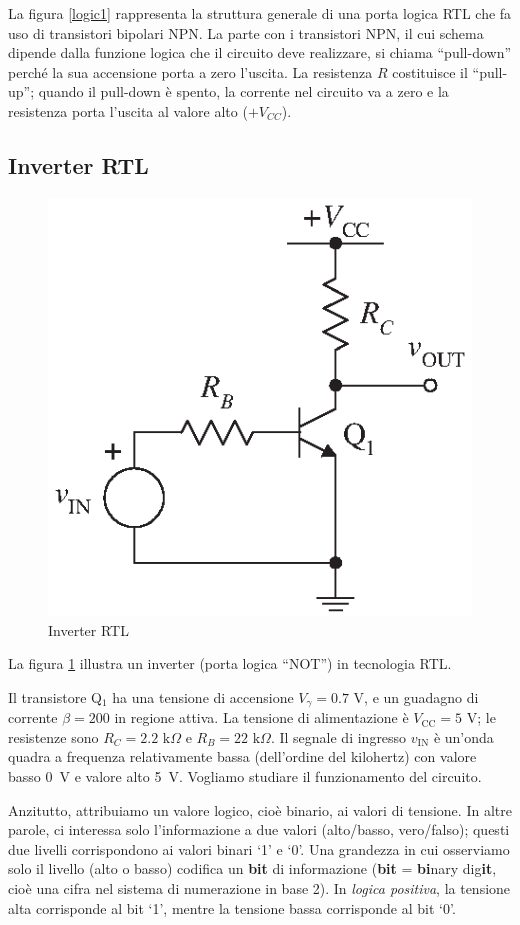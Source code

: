 \documentclass[10pt,a4paper,twoside,twocolumn]{article}
\begin{document}
La figura \ref{logic1} rappresenta la struttura generale di una porta logica RTL che fa uso di transistori bipolari NPN. La parte con i transistori NPN, il cui schema dipende dalla funzione logica che il circuito deve realizzare, si chiama ``pull-down'' perch\'e la sua accensione porta a zero l'uscita.
La resistenza $R$ costituisce il ``pull-up''; quando il pull-down \`e spento, la corrente nel circuito va a zero e la resistenza porta l'uscita al valore alto ($+V_{CC}$).


\subsection{Inverter RTL}
\begin{figure}[t]
\centering
\includegraphics[width=0.5\columnwidth]{npn_inv.eps}
\caption{Inverter RTL}
\label{npn_inv}
\end{figure}
La figura \ref{npn_inv} illustra un inverter (porta logica ``NOT'') in tecnologia RTL.

Il transistore Q$_1$ ha una tensione di accensione $V_\gamma = 0.7 \text{~V}$, e un guadagno di corrente $\beta = 200$ in regione attiva.
La tensione di alimentazione \`e
$V_\text{CC} = 5 \text{~V}$; le resistenze sono $R_{C} = 2.2\text{~k}\Omega$ e  $R_{B} = 22 \text{~k}\Omega$.
Il segnale di ingresso  $v_\text{IN}$ \`e un'onda quadra a frequenza relativamente bassa (dell'ordine del kilohertz) con valore basso 0~V e valore alto 5~V. 
Vogliamo studiare il funzionamento del circuito.

Anzitutto, attribuiamo un valore logico, cio\`e binario, ai valori di tensione.
In altre parole, ci interessa solo l'informazione a due valori (alto/basso, vero/falso);
questi due livelli corrispondono ai valori binari `1' e `0'.
Una grandezza in cui osserviamo solo il livello (alto o basso) codifica un \textbf{bit} di informazione (\textbf{bit} = \textbf{bi}nary dig\textbf{it}, cio\`e una cifra nel sistema di numerazione in base 2).
In \emph{logica positiva}, la tensione alta corrisponde al bit `1', mentre la tensione bassa corrisponde al bit `0'.
\end{document}
